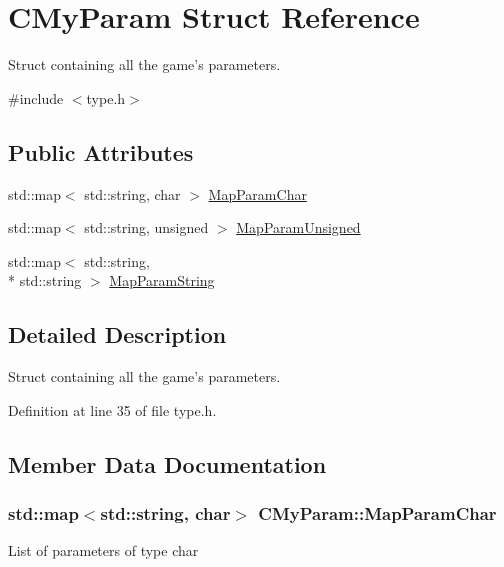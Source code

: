 \hypertarget{struct_c_my_param}{\section{C\+My\+Param Struct Reference}
\label{struct_c_my_param}
}


Struct containing all the game's parameters.  




{\ttfamily \#include $<$type.\+h$>$}

\subsection*{Public Attributes}
\begin{DoxyCompactItemize}
\item 
std\+::map$<$ std\+::string, char $>$ \hyperlink{struct_c_my_param_ac38ede5a509bd268e749bc9c960466d3}{Map\+Param\+Char}
\item 
std\+::map$<$ std\+::string, unsigned $>$ \hyperlink{struct_c_my_param_aece7d4bdf4103e359f769d08e97a459d}{Map\+Param\+Unsigned}
\item 
std\+::map$<$ std\+::string, \\*
std\+::string $>$ \hyperlink{struct_c_my_param_a6f22660b5eff76608f47c52930e6ecf1}{Map\+Param\+String}
\end{DoxyCompactItemize}


\subsection{Detailed Description}
Struct containing all the game's parameters. 

Definition at line 35 of file type.\+h.



\subsection{Member Data Documentation}
\hypertarget{struct_c_my_param_ac38ede5a509bd268e749bc9c960466d3}{
\subsubsection[{Map\+Param\+Char}]{\setlength{\rightskip}{0pt plus 5cm}std\+::map$<$std\+::string, char$>$ C\+My\+Param\+::\+Map\+Param\+Char}}\label{struct_c_my_param_ac38ede5a509bd268e749bc9c960466d3}
List of parameters of type char 

